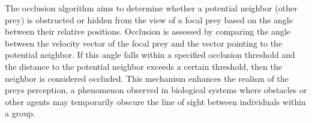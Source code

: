 \documentclass[9pt]{pnas-new}
\begin{document}
The occlusion algorithm aims to determine whether a potential neighbor (other prey) is obstructed or hidden from the view of a 
focal prey based on the angle between their relative positions. Occlusion is assessed by comparing the angle between the velocity 
vector of the focal prey and the vector pointing to the potential neighbor. If this angle falls within a specified occlusion threshold
and the distance to the potential neighbor exceeds a certain threshold, then the neighbor is considered occluded. 
This mechanism enhances the realism of the preys perception, a phenomenon observed in biological systems 
where obstacles or other agents may temporarily obscure the line of sight between individuals within a group.

\begin{center}
  \end{center}
\end{document}
